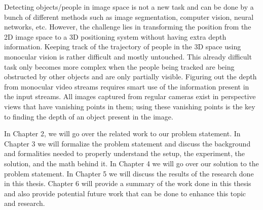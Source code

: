Detecting objects/people in image space is not a new task and can be done by a bunch of different methods such as image segmentation, computer vision, neural networks, etc. However, the challenge lies in transforming the position from the 2D image space to a 3D positioning system without having extra depth information. Keeping track of the trajectory of people in the 3D space using monocular vision is rather difficult and mostly untouched. This already difficult task only becomes more complex when the people being tracked are being obstructed by other objects and are only partially visible. Figuring out the depth from monocular video streams requires smart use of the information present in the input streams. All images captured from regular cameras exist in perspective views that have vanishing points in them; using these vanishing points is the key to finding the depth of an object present in the image.\newline

In Chapter 2, we will go over the related work to our problem statement. In Chapter 3 we will formalize the problem statement and discuss the background and formalities needed to properly understand the setup, the experiment, the solution, and the math behind it. In Chapter 4 we will go over our solution to the problem statement. In Chapter 5 we will discuss the results of the research done in this thesis. Chapter 6 will provide a summary of the work done in this thesis and also provide potential future work that can be done to enhance this topic and research.
